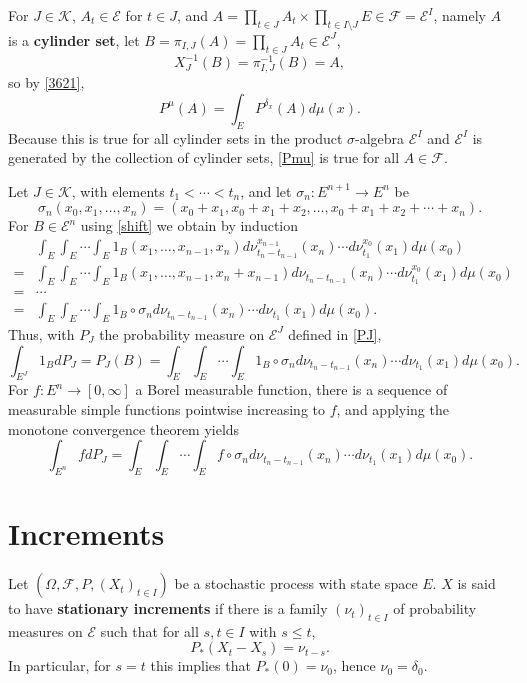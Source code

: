 \documentclass{article}
\theoremstyle{definition}
\theoremstyle{definition}
\begin{document}
For $J \in \mathscr{K}$, $A_t \in \mathscr{E}$ for $t \in J$, and $A = \prod_{t \in J} A_t \times \prod_{t \in I \setminus J} E \in \mathscr{F}=\mathscr{E}^I$, namely
$A$ is a \textbf{cylinder set},
let $B=\pi_{I,J}(A)=\prod_{t \in J} A_t \in \mathscr{E}^J$,
\[
X_J^{-1}(B) = \pi_{I,J}^{-1}(B) = A,
\]
so by \eqref{3621},
\begin{equation}
P^\mu(A) = \int_E P^{\delta_x}(A) d\mu(x).
\label{Pmu}
\end{equation}
Because this is true for all cylinder sets in the product $\sigma$-algebra $\mathscr{E}^I$ and
$\mathscr{E}^I$ is generated 
by the collection of cylinder sets,
\eqref{Pmu} is true for all $A \in \mathscr{F}$. 


Let $J \in \mathscr{K}$, with elements $t_1<\cdots<t_n$, 
and let $\sigma_n:E^{n+1} \to E^n$ be
\[
\sigma_n(x_0,x_1,\ldots,x_n) = (x_0+x_1,x_0+x_1+x_2,\ldots,x_0+x_1+x_2+\cdots+x_n).
\]
For $B \in \mathscr{E}^n$ using \eqref{shift} we obtain by induction
\[
\begin{split}
&\int_E \int_E \cdots \int_E 1_B(x_1,\ldots,x_{n-1},x_n) 
d\nu_{t_n-t_{n-1}}^{x_{n-1}}(x_n) \cdots d\nu_{t_1}^{x_0} (x_1) d\mu(x_0)\\
=&\int_E \int_E \cdots \int_E 1_B(x_1,\ldots,x_{n-1},x_n+x_{n-1}) d\nu_{t_n-t_{n-1}}(x_n) \cdots d\nu_{t_1}^{x_0} (x_1) d\mu(x_0)\\
=&\cdots\\
=&\int_E \int_E \cdots \int_E 1_B \circ \sigma_n d\nu_{t_n-t_{n-1}}(x_n) \cdots d\nu_{t_1}(x_1) d\mu(x_0).
\end{split}
\]
Thus, with $P_J$ the probability measure on $\mathscr{E}^J$ defined in \eqref{PJ},
\[
\int_{E^J} 1_B dP_J = P_J(B) = \int_E \int_E \cdots \int_E 1_B \circ \sigma_n d\nu_{t_n-t_{n-1}}(x_n) \cdots d\nu_{t_1}(x_1) d\mu(x_0).
\]
For $f:E^n \to [0,\infty]$ a Borel measurable function, there is a sequence of measurable simple functions pointwise increasing to $f$, and applying
the monotone convergence theorem yields 
\begin{equation}
\int_{E^n} f dP_J
=\int_E \int_E \cdots \int_E f \circ \sigma_n d\nu_{t_n-t_{n-1}}(x_n) \cdots d\nu_{t_1}(x_1) d\mu(x_0).
\label{373}
\end{equation}




\section{Increments}
Let $(\Omega,\mathscr{F},P,(X_t)_{t \in I})$ be a stochastic process 
with state space $E$. $X$ is said to have \textbf{stationary increments} if 
there is a family $(\nu_t)_{t \in I}$ of probability measures on $\mathscr{E}$ 
such that  for all $s,t \in I$ with $s \leq t$,
\[
P_*(X_t-X_s) = \nu_{t-s}.
\]
In particular, for $s=t$ this implies that $P_*(0)=\nu_0$, hence
$\nu_0=\delta_0$. 
\end{document}
